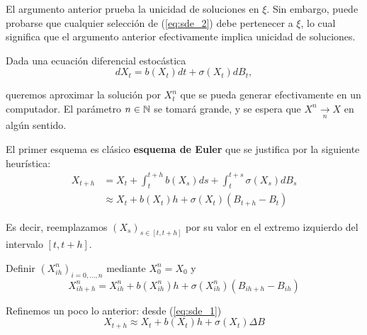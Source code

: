 \begin{remark}
    El argumento anterior prueba la unicidad de soluciones en $\xi$. Sin embargo, puede probarse que cualquier selección de (\ref{eq:sde_2}) debe pertenecer a $\xi$, lo cual significa que el argumento anterior efectivamente implica unicidad de soluciones. 
\end{remark}


Dada una ecuación diferencial estocástica 
\begin{equation*}
        dX_t = b(X_t)dt + \sigma(X_t) dB_t,
\end{equation*}

queremos aproximar la solución por $X_t^{n}$ que se pueda generar efectivamente en un computador. 
\newp El parámetro $n \in \mathbb{N}$ se tomará grande, y se espera que $X^{n} \xrightarrow[n]{} X$ en algún sentido. 

El primer esquema es clásico \textbf{esquema de Euler} que se justifica por la siguiente heurística: 
\begin{align*}
        \label{eq:sde_3}
        \tag{*}
        X_{t+h} &= X_t + \int_{t}^{t+h} b(X_s) ds + \int_{t}^{t+s} \sigma(X_s) dB_s \\
                &\approx X_t + b(X_t) h + \sigma(X_t) (B_{t+h} - B_{t})
\end{align*}

Es decir, reemplazamos $(X_s)_{s \in [t,t+h]}$ por su valor en el extremo izquierdo del intervalo $[t,t+h]$.



\begin{algorithm}
\begin{leftbar}
    Definir $(X^{n}_{ih})_{i = 0, \ldots, n}$ mediante $X_{0}^{n} = X_0$ y
        \begin{equation*}
                X^{n}_{ih + h} = X^{n}_{ih} + b(X^{n}_{ih})h + \sigma(X^{n}_{ih})(B_{ih + h} - B_{ih})
        \end{equation*}
\end{leftbar}
\end{algorithm}
Refinemos un poco lo anterior: desde (\ref{eq:sde_1}) 
\begin{equation*}
        X_{t+h} \approx X_t + b(X_t) h + \sigma(X_t) \Delta B
\end{equation*}


